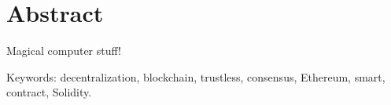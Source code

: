 
\thispagestyle{plain}			%
\section*{Abstract}
Magical computer stuff!

\vfill
\noindent Keywords: decentralization, blockchain, trustless, consensus, Ethereum, smart, contract, Solidity.

\newpage				%
\thispagestyle{empty}
\mbox{}